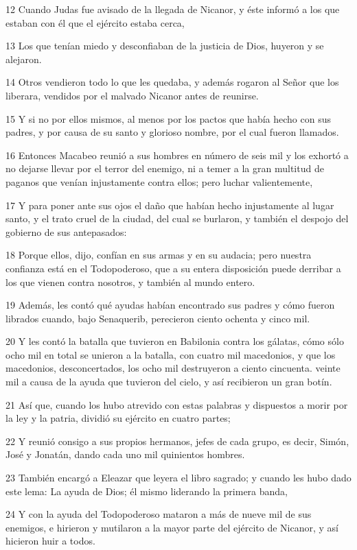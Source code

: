 \par 12 Cuando Judas fue avisado de la llegada de Nicanor, y éste informó a los que estaban con él que el ejército estaba cerca,
\par 13 Los que tenían miedo y desconfiaban de la justicia de Dios, huyeron y se alejaron.
\par 14 Otros vendieron todo lo que les quedaba, y además rogaron al Señor que los liberara, vendidos por el malvado Nicanor antes de reunirse.
\par 15 Y si no por ellos mismos, al menos por los pactos que había hecho con sus padres, y por causa de su santo y glorioso nombre, por el cual fueron llamados.
\par 16 Entonces Macabeo reunió a sus hombres en número de seis mil y los exhortó a no dejarse llevar por el terror del enemigo, ni a temer a la gran multitud de paganos que venían injustamente contra ellos; pero luchar valientemente,
\par 17 Y para poner ante sus ojos el daño que habían hecho injustamente al lugar santo, y el trato cruel de la ciudad, del cual se burlaron, y también el despojo del gobierno de sus antepasados:
\par 18 Porque ellos, dijo, confían en sus armas y en su audacia; pero nuestra confianza está en el Todopoderoso, que a su entera disposición puede derribar a los que vienen contra nosotros, y también al mundo entero.
\par 19 Además, les contó qué ayudas habían encontrado sus padres y cómo fueron librados cuando, bajo Senaquerib, perecieron ciento ochenta y cinco mil.
\par 20 Y les contó la batalla que tuvieron en Babilonia contra los gálatas, cómo sólo ocho mil en total se unieron a la batalla, con cuatro mil macedonios, y que los macedonios, desconcertados, los ocho mil destruyeron a ciento cincuenta. veinte mil a causa de la ayuda que tuvieron del cielo, y así recibieron un gran botín.
\par 21 Así que, cuando los hubo atrevido con estas palabras y dispuestos a morir por la ley y la patria, dividió su ejército en cuatro partes;
\par 22 Y reunió consigo a sus propios hermanos, jefes de cada grupo, es decir, Simón, José y Jonatán, dando cada uno mil quinientos hombres.
\par 23 También encargó a Eleazar que leyera el libro sagrado; y cuando les hubo dado este lema: La ayuda de Dios; él mismo liderando la primera banda,
\par 24 Y con la ayuda del Todopoderoso mataron a más de nueve mil de sus enemigos, e hirieron y mutilaron a la mayor parte del ejército de Nicanor, y así hicieron huir a todos.

